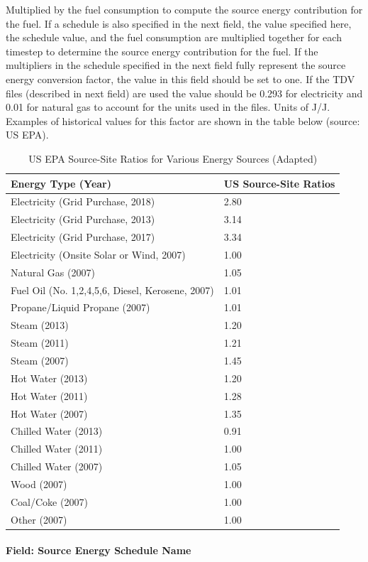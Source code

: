 Multiplied by the fuel consumption to compute the source energy contribution for the fuel. If a schedule is also specified in the next field, the value specified here, the schedule value, and the fuel consumption are multiplied together for each timestep to determine the source energy contribution for the fuel. If the multipliers in the schedule specified in the next field fully represent the source energy conversion factor, the value in this field should be set to one. If the TDV files (described in next field) are used the value should be 0.293 for electricity and 0.01 for natural gas to account for the units used in the files. Units of J/J.  Examples of historical values for this factor are shown in the table below (source: US EPA).

{\scriptsize
\begin{longtable}[c]{p{4in}p{1.5in}}
\caption{US EPA Source-Site Ratios for Various Energy Sources (Adapted)\label{table:us_epa_source_site_ratios_for_various_energy_sources}} \tabularnewline
\toprule
Energy Type (Year) & US Source-Site Ratios \tabularnewline
\midrule
\endfirsthead

Electricity (Grid Purchase, 2018) & 2.80 \tabularnewline
Electricity (Grid Purchase, 2013) & 3.14 \tabularnewline
Electricity (Grid Purchase, 2017) & 3.34 \tabularnewline
Electricity (Onsite Solar or Wind, 2007) & 1.00 \tabularnewline
\midrule
Natural Gas (2007) & 1.05 \tabularnewline
Fuel Oil (No. 1,2,4,5,6, Diesel, Kerosene, 2007) & 1.01 \tabularnewline
Propane/Liquid Propane (2007) & 1.01 \tabularnewline
\midrule
Steam (2013) & 1.20 \tabularnewline
Steam (2011) & 1.21 \tabularnewline
Steam (2007) & 1.45 \tabularnewline
\midrule
Hot Water (2013) & 1.20 \tabularnewline
Hot Water (2011) & 1.28 \tabularnewline
Hot Water (2007) & 1.35 \tabularnewline
\midrule
Chilled Water (2013) & 0.91 \tabularnewline
Chilled Water (2011) & 1.00 \tabularnewline
Chilled Water (2007) & 1.05 \tabularnewline
\midrule
Wood (2007) & 1.00 \tabularnewline
Coal/Coke (2007) & 1.00 \tabularnewline
Other (2007) & 1.00 \tabularnewline

\bottomrule
\end{longtable}
}

\paragraph{Field: Source Energy Schedule Name}\label{field-source-energy-schedule-name}

